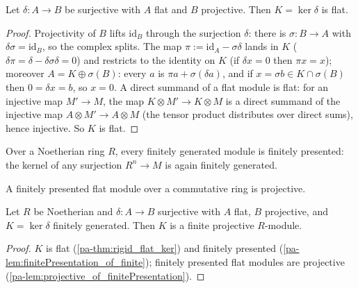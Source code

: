 \begin{theorem}
  \label{pa-thm:rigid_flat_ker}
  \leanok

  Let \(\delta : A \to B\) be surjective with \(A\) flat and \(B\) projective. Then
  \(K = \ker \delta\) is flat.
\end{theorem}
\begin{proof}
  \leanok
  Projectivity of \(B\) lifts \(\mathrm{id}_B\) through the surjection \(\delta\):
  there is \(\sigma : B \to A\) with \(\delta \sigma = \mathrm{id}_B\), so the complex
  splits. The map \(\pi := \mathrm{id}_A - \sigma\delta\) lands in \(K\)
  (\(\delta\pi = \delta - \delta\sigma\delta = 0\)) and restricts to the identity on
  \(K\) (if \(\delta x = 0\) then \(\pi x = x\)); moreover
  \(A = K \oplus \sigma(B)\): every \(a\) is \(\pi a + \sigma(\delta a)\), and if
  \(x = \sigma b \in K \cap \sigma(B)\) then \(0 = \delta x = b\), so \(x = 0\). A
  direct summand of a flat module is flat: for an injective map \(M' \to M\), the map
  \(K \otimes M' \to K \otimes M\) is a direct summand of the injective map
  \(A \otimes M' \to A \otimes M\) (the tensor product distributes over direct sums),
  hence injective. So \(K\) is flat.
\end{proof}

\begin{lemma}
  \label{pa-lem:finitePresentation_of_finite}
  \mathlibok

  Over a Noetherian ring \(R\), every finitely generated module is finitely presented:
  the kernel of any surjection \(R^n \to M\) is again finitely generated.
\end{lemma}

\begin{lemma}
  \label{pa-lem:projective_of_finitePresentation}
  \mathlibok

  A finitely presented flat module over a commutative ring is projective.
\end{lemma}

\begin{theorem}
  \label{pa-thm:rigid_projective_ker}
  \leanok

  Let \(R\) be Noetherian and \(\delta : A \to B\) surjective with \(A\) flat, \(B\)
  projective, and \(K = \ker \delta\) finitely generated. Then \(K\) is a finite
  projective \(R\)-module.
\end{theorem}
\begin{proof}
  \leanok
  \(K\) is flat (\ref{pa-thm:rigid_flat_ker}) and finitely presented
  (\ref{pa-lem:finitePresentation_of_finite}); finitely presented flat modules are
  projective (\ref{pa-lem:projective_of_finitePresentation}).
\end{proof}

